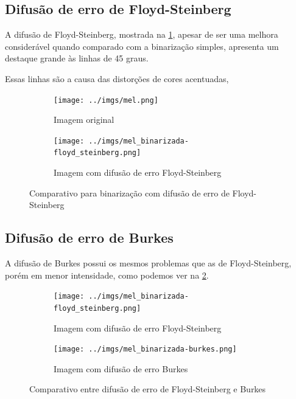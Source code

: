 \documentclass[brazilian,a4paper,twocolumn]{article}
\begin{document}
    \subsection{Difusão de erro de Floyd-Steinberg}

        A difusão de Floyd-Steinberg, mostrada na \cref{fig:binarizada-floyd_steinberg}, apesar de ser uma melhora considerável quando comparado com a binarização simples, apresenta um destaque grande às linhas de 45 graus.

        Essas linhas são a causa das distorções de cores acentuadas,

        \begin{figure}
            \centering
            \begin{subfigure}{0.24\textwidth}
                \texttt{[image: ../imgs/mel.png]}
                \caption{Imagem original}
            \end{subfigure}
            \begin{subfigure}{0.24\textwidth}
                \texttt{[image: ../imgs/mel\_binarizada-floyd\_steinberg.png]}
                \caption{Imagem com difusão de erro Floyd-Steinberg}
            \end{subfigure}

            \caption{Comparativo para binarização com difusão de erro de Floyd-Steinberg}
            \label{fig:binarizada-floyd_steinberg}
        \end{figure}

    \subsection{Difusão de erro de Burkes}

        A difusão de Burkes possui os mesmos problemas que as de Floyd-Steinberg, porém em menor intensidade, como podemos ver na \cref{fig:binarizada-floyd_steinberg-burkes}.

        \begin{figure}
            \centering
            \begin{subfigure}{0.24\textwidth}
                \texttt{[image: ../imgs/mel\_binarizada-floyd\_steinberg.png]}
                \caption{Imagem com difusão de erro Floyd-Steinberg}
            \end{subfigure}
            \begin{subfigure}{0.24\textwidth}
                \texttt{[image: ../imgs/mel\_binarizada-burkes.png]}
                \caption{Imagem com difusão de erro Burkes}
            \end{subfigure}

            \caption{Comparativo entre difusão de erro de Floyd-Steinberg e Burkes}
            \label{fig:binarizada-floyd_steinberg-burkes}
        \end{figure}
\end{document}
